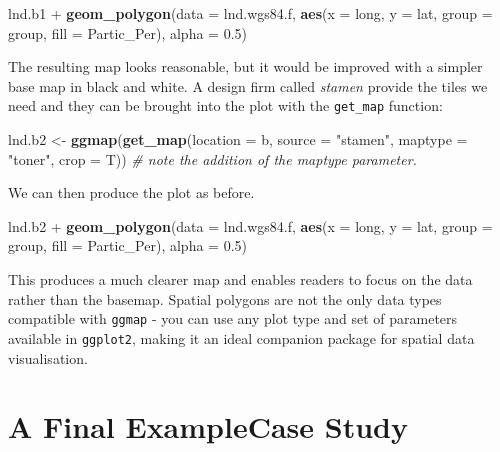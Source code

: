 \documentclass[]{article}
\newenvironment{Shaded}{}{}
\newcommand{\KeywordTok}[1]{\textcolor[rgb]{0.00,0.44,0.13}{\textbf{{#1}}}}
\newcommand{\DataTypeTok}[1]{\textcolor[rgb]{0.56,0.13,0.00}{{#1}}}
\newcommand{\FloatTok}[1]{\textcolor[rgb]{0.25,0.63,0.44}{{#1}}}
\newcommand{\StringTok}[1]{\textcolor[rgb]{0.25,0.44,0.63}{{#1}}}
\newcommand{\CommentTok}[1]{\textcolor[rgb]{0.38,0.63,0.69}{\textit{{#1}}}}
\newcommand{\NormalTok}[1]{{#1}}
\providecommand{\DIFaddbegin}{} %
\providecommand{\DIFaddend}{} %
\providecommand{\DIFdelbegin}{} %
\providecommand{\DIFdelend}{} %
\begin{document}
\begin{Shaded}
\begin{Highlighting}[]
\NormalTok{lnd.b1 + }\KeywordTok{geom_polygon}\NormalTok{(}\DataTypeTok{data =} \NormalTok{lnd.wgs84.f, }\KeywordTok{aes}\NormalTok{(}\DataTypeTok{x =} \NormalTok{long, }\DataTypeTok{y =} \NormalTok{lat, }\DataTypeTok{group =} \NormalTok{group, }
    \DataTypeTok{fill =} \NormalTok{Partic_Per), }\DataTypeTok{alpha =} \FloatTok{0.5}\NormalTok{)}
\end{Highlighting}
\end{Shaded}
The resulting map looks reasonable, but it would be improved with a
simpler base map in black and white. A design firm called \emph{stamen}
provide the tiles we need and they can be brought into the plot with the
\texttt{get\_map} function:

\begin{Shaded}
\begin{Highlighting}[]
\NormalTok{lnd.b2 <- }\KeywordTok{ggmap}\NormalTok{(}\KeywordTok{get_map}\NormalTok{(}\DataTypeTok{location =} \NormalTok{b, }\DataTypeTok{source =} \StringTok{"stamen"}\NormalTok{, }\DataTypeTok{maptype =} \StringTok{"toner"}\NormalTok{, }
    \DataTypeTok{crop =} \NormalTok{T))  }\CommentTok{# note the addition of the maptype parameter.}
\end{Highlighting}
\end{Shaded}
We can then produce the plot as before.

\begin{Shaded}
\begin{Highlighting}[]
\NormalTok{lnd.b2 + }\KeywordTok{geom_polygon}\NormalTok{(}\DataTypeTok{data =} \NormalTok{lnd.wgs84.f, }\KeywordTok{aes}\NormalTok{(}\DataTypeTok{x =} \NormalTok{long, }\DataTypeTok{y =} \NormalTok{lat, }\DataTypeTok{group =} \NormalTok{group, }
    \DataTypeTok{fill =} \NormalTok{Partic_Per), }\DataTypeTok{alpha =} \FloatTok{0.5}\NormalTok{)}
\end{Highlighting}
\end{Shaded}
\DIFaddbegin 

\DIFaddend This produces a much clearer map and enables readers to focus on the
data rather than the basemap. Spatial polygons are not the only data
types compatible with \texttt{ggmap} - you can use any plot type and set
of parameters available in \texttt{ggplot2}, making it an ideal
companion package for spatial data visualisation.

\section{\DIFdelbegin {A Final Example}\DIFdelend \DIFaddbegin {Case
Study}\DIFaddend }
\DIFdelbegin %
\end{document}
